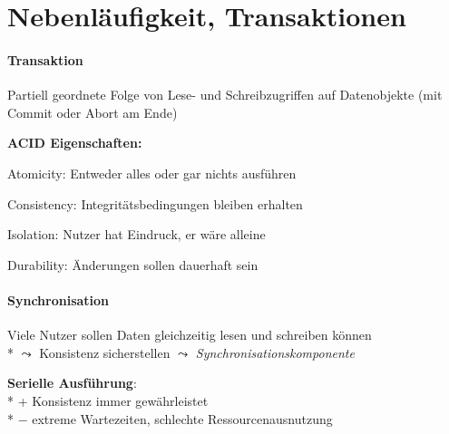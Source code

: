 \section{Nebenläufigkeit, Transaktionen}
\label{sec:parallel}

\paragraph{Transaktion}
\begin{items}
	\item Partiell geordnete Folge von Lese- und Schreibzugriffen auf Datenobjekte (mit Commit oder Abort am Ende)
	\item \textbf{ACID Eigenschaften:}
	\item Atomicity: Entweder alles oder gar nichts ausführen
	\item Consistency: Integritätsbedingungen bleiben erhalten
	\item Isolation: Nutzer hat Eindruck, er wäre alleine
	\item Durability: Änderungen sollen dauerhaft sein
\end{items}

\paragraph{Synchronisation}
\begin{items}
	\item Viele Nutzer sollen Daten gleichzeitig lesen und schreiben können
		\\*
		\( \leadsto \) Konsistenz sicherstellen \( \leadsto \) \emph{Synchronisationskomponente}
	\item \textbf{Serielle Ausführung}: 
		\\*
		+ Konsistenz immer gewährleistet 
		\\*
		$-$ extreme Wartezeiten, schlechte Ressourcenausnutzung
\end{items}

